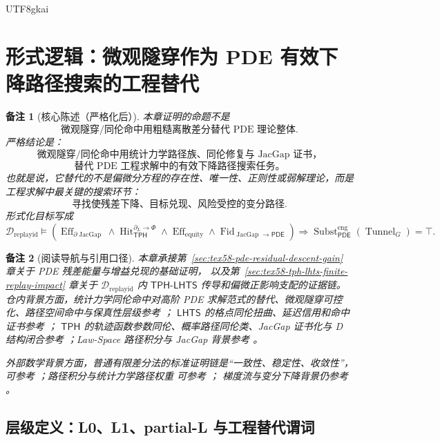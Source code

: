 \documentclass[12pt]{article}
\newtheorem{remark}{备注}[section]
\newcommand{\TPH}{\ensuremath{\mathsf{TPH}}}
\newcommand{\LHTS}{\ensuremath{\mathsf{LHTS}}}
\newcommand{\TPHLHTS}{\ensuremath{\mathsf{TPH\mbox{-}LHTS}}}
\newcommand{\PDE}{\ensuremath{\mathsf{PDE}}}
\DeclareMathOperator{\Eff}{Eff}
\DeclareMathOperator{\Hit}{Hit}
\DeclareMathOperator{\JacGap}{JacGap}
\DeclareMathOperator{\Tunnel}{Tunnel}
\DeclareMathOperator{\Subst}{Subst}
\DeclareMathOperator{\Fid}{Fid}
\begin{document}
\begin{CJK*}{UTF8}{gkai}
\section{形式逻辑：微观隧穿作为 PDE 有效下降路径搜索的工程替代}
\label{sec:tex58-microtunnel-pde-descent-substitution}

\begin{remark}[核心陈述（严格化后）]
本章证明的命题不是
\[
  \text{微观隧穿/同伦命中用粗糙离散差分替代 PDE 理论整体}.
\]
严格结论是：
\[
  \boxed{
  \text{微观隧穿/同伦命中用统计力学路径族、同伦修复与 JacGap 证书，}
  }
\]
\[
  \boxed{
  \text{替代 PDE 工程求解中的有效下降路径搜索任务。}
  }
\]
也就是说，它替代的不是偏微分方程的存在性、唯一性、正则性或弱解理论，而是工程求解中最关键的搜索环节：
\[
  \text{寻找使残差下降、目标兑现、风险受控的变分路径}.
\]
形式化目标写成
\[
  \boxed{
  \mathcal D_{\mathrm{replayid}}
  \models
  \left(
  \Eff_{\partial\JacGap}
  \wedge
  \Hit_{\TPH}^{\partial_L\to\Phi}
  \wedge
  \Eff_{\mathrm{equity}}
  \wedge
  \Fid_{\JacGap\to\PDE}
  \right)
  \Rightarrow
  \Subst_{\PDE}^{\mathrm{eng}}(\Tunnel_G)=\top.
  }
\]
\end{remark}

\begin{remark}[阅读导航与引用口径]
本章承接第~\ref{sec:tex58-pde-residual-descent-gain} 章关于 PDE 残差能量与增益兑现的基础证明，
以及第~\ref{sec:tex58-tph-lhts-finite-replay-impact} 章关于 \(\mathcal D_{\mathrm{replayid}}\) 内
\TPHLHTS{} 传导和偏微正影响支配的证据链。仓内背景方面，统计力学同伦命中对高阶 PDE
求解范式的替代、微观隧穿可控化、路径空间命中与保真性层级参考 \cite{RepoTex55PDEParadigm}；
\LHTS{} 的格点同伦扭曲、延迟信用和命中证书参考 \cite{RepoTex56LHTS}；
\TPH{} 的轨迹函数参数同伦、概率路径同伦类、JacGap 证书化与 D 结构闭合参考
\cite{RepoTex57TPHLHTS}；Law-Space 路径积分与 JacGap 背景参考
\cite{RepoAppMathVol1,RepoEconomicsVol}。

外部数学背景方面，普通有限差分法的标准证明链是“一致性、稳定性、收敛性”，可参考
\cite{LeVeque2007FiniteDifference,Strikwerda2004FiniteDifference}；路径积分与统计力学路径权重
可参考 \cite{FeynmanHibbs1965PathIntegrals,FreidlinWentzell2012RandomPerturbations}；
梯度流与变分下降背景仍参考 \cite{AmbrosioGigliSavare2008GradientFlows,NocedalWright2006NumericalOptimization}。
\end{remark}

\subsection{层级定义：L0、L1、partial-L 与工程替代谓词}
\label{subsec:tex58-layers-and-substitution}


\end{CJK*}
\end{document}
